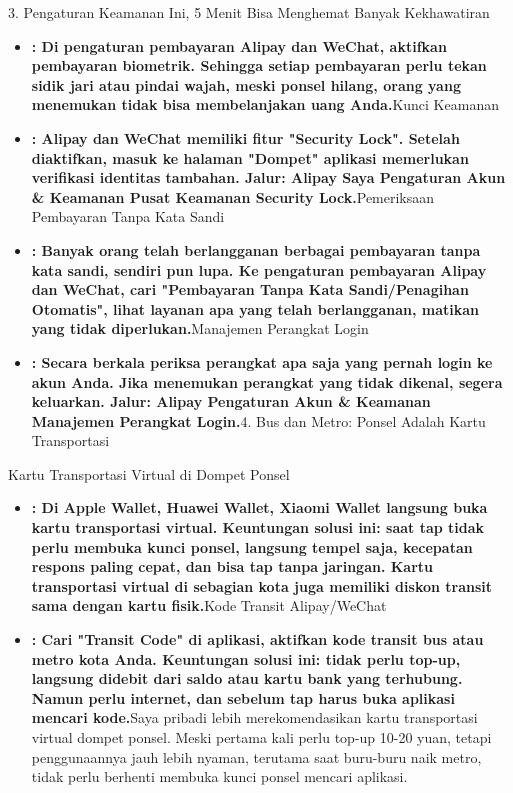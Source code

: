3. Pengaturan Keamanan Ini, 5 Menit Bisa Menghemat Banyak Kekhawatiran


\begin{itemize}
  \item \textbf{: Di pengaturan pembayaran Alipay dan WeChat, aktifkan pembayaran biometrik. Sehingga setiap pembayaran perlu tekan sidik jari atau pindai wajah, meski ponsel hilang, orang yang menemukan tidak bisa membelanjakan uang Anda.}Kunci Keamanan
  \item \textbf{: Alipay dan WeChat memiliki fitur "Security Lock". Setelah diaktifkan, masuk ke halaman "Dompet" aplikasi memerlukan verifikasi identitas tambahan. Jalur: Alipay Saya Pengaturan Akun \& Keamanan Pusat Keamanan Security Lock.}Pemeriksaan Pembayaran Tanpa Kata Sandi
  \item \textbf{: Banyak orang telah berlangganan berbagai pembayaran tanpa kata sandi, sendiri pun lupa. Ke pengaturan pembayaran Alipay dan WeChat, cari "Pembayaran Tanpa Kata Sandi/Penagihan Otomatis", lihat layanan apa yang telah berlangganan, matikan yang tidak diperlukan.}Manajemen Perangkat Login
  \item \textbf{: Secara berkala periksa perangkat apa saja yang pernah login ke akun Anda. Jika menemukan perangkat yang tidak dikenal, segera keluarkan. Jalur: Alipay Pengaturan Akun \& Keamanan Manajemen Perangkat Login.}4. Bus dan Metro: Ponsel Adalah Kartu Transportasi
\end{itemize}


Kartu Transportasi Virtual di Dompet Ponsel

\begin{itemize}
  \item \textbf{: Di Apple Wallet, Huawei Wallet, Xiaomi Wallet langsung buka kartu transportasi virtual. Keuntungan solusi ini: saat tap tidak perlu membuka kunci ponsel, langsung tempel saja, kecepatan respons paling cepat, dan bisa tap tanpa jaringan. Kartu transportasi virtual di sebagian kota juga memiliki diskon transit sama dengan kartu fisik.}Kode Transit Alipay/WeChat
  \item \textbf{: Cari "Transit Code" di aplikasi, aktifkan kode transit bus atau metro kota Anda. Keuntungan solusi ini: tidak perlu top-up, langsung didebit dari saldo atau kartu bank yang terhubung. Namun perlu internet, dan sebelum tap harus buka aplikasi mencari kode.}Saya pribadi lebih merekomendasikan kartu transportasi virtual dompet ponsel. Meski pertama kali perlu top-up 10-20 yuan, tetapi penggunaannya jauh lebih nyaman, terutama saat buru-buru naik metro, tidak perlu berhenti membuka kunci ponsel mencari aplikasi.
\end{itemize}

